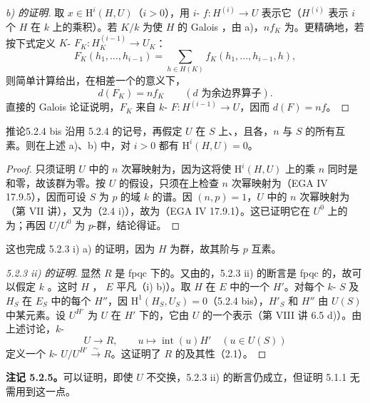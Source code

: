 \begin{proof}[b) 的证明]
取 $x\in\mathrm H^i(H,U)$（$i>0$），用 $i$- $f:H^{(i)}\to U$ 表示它（$H^{(i)}$ 表示 $i$ 个 $H$ 在 $k$ 上的乘积）。若 $K/k$ 为使 $H$ 的 Galois ，由 a)，$nf_K$ 为。更精确地，若按下式定义 $K$- $F_K:H_K^{(i-1)}\to U_K$：
\[F_K(h_1,\ldots,h_{i-1})=\sum_{h\in H(K)}f_K(h_1,\ldots,h_{i-1},h),\]
则简单计算给出，在相差一个的意义下，
\[d(F_K)=nf_K\qquad(d\text{ 为余边界算子}).\]
直接的 Galois 论证说明，$F_K$ 来自 $k$- $F:H^{(i-1)}\to U$，因而 $d(F)=nf$。
\end{proof}
\begin{SGAresult}{推论}{5.2.4 bis}
沿用 5.2.4 的记号，再假定 $U$ 在 $S$ 上、，且各，$n$ 与 $S$ 的所有互素。则在上述 a)、b) 中，对 $i>0$ 都有 $\mathrm H^i(H,U)=0$。
\end{SGAresult}
\begin{proof}
只须证明 $U$ 中的 $n$ 次幂映射为，因为这将使 $\mathrm H^i(H,U)$ 上的乘 $n$ 同时是和零，故该群为零。按 $U$ 的假设，只须在上检查 $n$ 次幂映射为（EGA IV 17.9.5），因而可设 $S$ 为 $p$ 的域 $k$ 的谱。因 $(n,p)=1$，$U$ 中的 $n$ 次幂映射为（第 VII 讲），又为（2.4 i)），故为（EGA IV 17.9.1）。这已证明它在 $U^0$ 上的为；再因 $U/U^0$ 为 $p$-群，结论得证。
\end{proof}
这也完成 5.2.3 i) a) 的证明，因为 $H$ 为群，故其阶与 $p$ 互素。
\begin{proof}[5.2.3 ii) 的证明]
显然 $R$ 是 fpqc 下的。又由的，5.2.3 ii) 的断言是 fpqc 的，故可以假定 $k$ 。这时 $H$ ， $E$ 平凡（i) b)）。取 $H$ 在 $E$ 中的一个 $H'$。对每个 $k$- $S$ 及 $H_S$ 在 $E_S$ 中的每个 $H''$，因 $\mathrm H^1(H_S,U_S)=0$（5.2.4 bis），$H'_S$ 和 $H''$ 由 $U(S)$ 中某元素。设 $U^{H'}$ 为 $U$ 在 $H'$ 下的，它由 $U$ 的一个表示（第 VIII 讲 6.5 d)）。由上述讨论，$k$-
\[U\longrightarrow R,\qquad u\longmapsto\operatorname{int}(u)H'\quad(u\in U(S))\]
定义一个 $k$- $U/U^{H'}\xrightarrow{\sim}R$。这证明了 $R$ 的及其性（2.1）。
\end{proof}
\textbf{注记 5.2.5。}可以证明，即使 $U$ 不交换，5.2.3 ii) 的断言仍成立，但证明 5.1.1 无需用到这一点。

